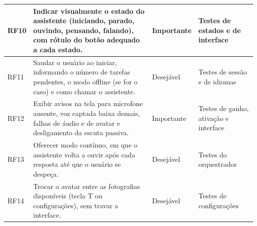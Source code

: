 \begin{singlespace}
\begin{tabularx}{\textwidth}{|C{1.25cm}|L|C{2.0cm}|P{3.2cm}|}
RF10 & Indicar visualmente o estado do assistente (iniciando, parado, ouvindo, pensando, falando), com
       rótulo do botão adequado a cada estado. & Importante & Testes de estados e de interface \\ \hline
RF11 & Saudar o usuário ao iniciar, informando o número de tarefas pendentes, o modo offline (se for o
       caso) e como chamar o assistente. & Desejável & Testes de sessão e de idiomas \\ \hline
RF12 & Exibir avisos na tela para microfone ausente, voz captada baixa demais, falhas de áudio e de
       avatar e desligamento da escuta passiva. & Importante & Testes de ganho, ativação e interface \\ \hline
RF13 & Oferecer modo contínuo, em que o assistente volta a ouvir após cada resposta até que o usuário se
       despeça. & Desejável & Testes do orquestrador \\ \hline
RF14 & Trocar o avatar entre as fotografias disponíveis (tecla T ou configurações), sem travar a interface. & Desejável & Testes de configurações \\ \hline
\end{tabularx}
\end{singlespace}

